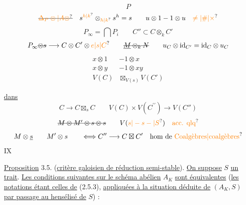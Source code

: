 \[
P
\]
\[
\deleted{\unsure{\Delta_P\otimes|A\otimes}}\quad s^{\unsure{h|k}}\otimes_{\unsure{h|k}}s^{h}=s\qquad
u\otimes1-1\otimes u\quad\unsure{\ne|\#|\times}
\]
\[
P_{\infty}=\bigcap P_i\qquad C''\subset C\otimes_{k}C'
\]
\[
P_{\infty}\deleted{\otimes s}\longrightarrow C\otimes C'\otimes\unsure{e|s|C}
\qquad \deleted{\underline{M}\otimes_{k}N}\qquad
u_C\otimes\mathrm{id}_{C'}=\mathrm{id}_{C}\otimes u_C
\]
\[
\begin{aligned}
x\otimes1&-1\otimes x\\
x\otimes y&-1\otimes xy\\
V(C)&\boxtimes_{V(s)}V(C')
\end{aligned}
\]

\uline{ dans }
\[
C\longrightarrow C\boxtimes_{s}C\qquad
V(C)\times V(C^{\prime\prime})\longrightarrow V(C'')
\]
\[
\deleted{M\otimes M'\otimes s\otimes s}\qquad V(\unsure{s|-s-|S})\quad\text{\unsure{acc. qlq}}
\]
\[
M\otimes\underline{s}\qquad M'\otimes s\qquad
\Longleftrightarrow C''\longrightarrow C\boxtimes C'\quad\text{hom de \unsure{Coalgèbres|coalgèbres}}
\]
\hfill IX

\uline{Proposition} 3.5. (\uline{critère galoisien de réduction semi-stable}). \uline{On suppose} $S$ \uline{un trait}. \uline{Les conditions suivantes sur le schéma abélien} $A_K$ \uline{sont équivalentes} (\uline{les notations étant celles de} (2.5.3), \uline{appliquées à la situation déduite de} $(A_K,S)$ \uline{par passage au hensélisé de} $S$) :


